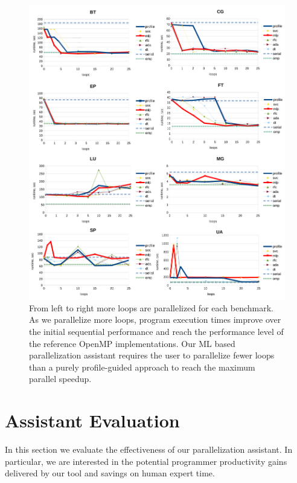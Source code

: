 \begin{figure}[t!]
\centering
\includegraphics[width=1.0\textwidth]{images/perf_conv_curves_new.pdf}
\caption{From left to right more loops are parallelized for each benchmark. As we parallelize more loops, program execution times improve over the initial sequential performance and reach the performance level of the reference OpenMP implementations. Our ML based parallelization assistant requires the user to parallelize fewer loops than a purely profile-guided approach to reach the maximum parallel speedup.}
\label{fig:performance_convergence_line}
\vspace*{5mm} %
\end{figure}

\section{Assistant Evaluation}
\label{evaluation}

In this section we evaluate the effectiveness of our parallelization assistant. In particular, we are interested in the potential programmer productivity gains delivered by our tool and savings on human expert time.

